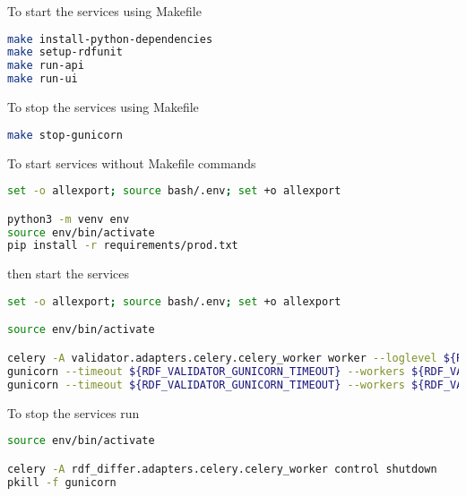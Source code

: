 To start the services using Makefile

\begin{lstlisting}[language=bash,]
make install-python-dependencies
make setup-rdfunit
make run-api
make run-ui
\end{lstlisting}

To stop the services using Makefile

\begin{lstlisting}[language=bash,]
make stop-gunicorn
\end{lstlisting}

To start services without Makefile commands

\begin{lstlisting}[language=bash,]
set -o allexport; source bash/.env; set +o allexport

python3 -m venv env
source env/bin/activate
pip install -r requirements/prod.txt
\end{lstlisting}

then start the services

\begin{lstlisting}[language=bash,]
set -o allexport; source bash/.env; set +o allexport

source env/bin/activate

celery -A validator.adapters.celery.celery_worker worker --loglevel ${RDF_VALIDATOR_LOG_LEVEL} --logfile ${RDF_VALIDATOR_CELERY_LOGS} --detach
gunicorn --timeout ${RDF_VALIDATOR_GUNICORN_TIMEOUT} --workers ${RDF_VALIDATOR_GUNICORN_API_WORKERS} --bind 0.0.0.0:${RDF_VALIDATOR_API_PORT} --reload validator.entrypoints.api.run:app --log-file ${RDF_VALIDATOR_API_LOGS} --log-level ${RDF_VALIDATOR_LOG_LEVEL} --daemon
gunicorn --timeout ${RDF_VALIDATOR_GUNICORN_TIMEOUT} --workers ${RDF_VALIDATOR_GUNICORN_UI_WORKERS} --bind 0.0.0.0:${RDF_VALIDATOR_UI_PORT} --reload validator.entrypoints.ui.run:app --log-file ${RDF_VALIDATOR_UI_LOGS} --log-level ${RDF_VALIDATOR_LOG_LEVEL} --daemon
\end{lstlisting}

To stop the services run

\begin{lstlisting}[language=bash,]
source env/bin/activate

celery -A rdf_differ.adapters.celery.celery_worker control shutdown
pkill -f gunicorn
\end{lstlisting}